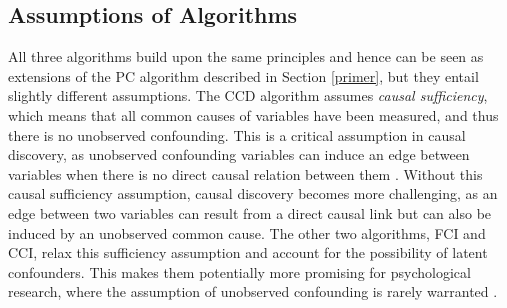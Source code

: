 \documentclass[twoside, 11pt]{article}
\begin{document}



\subsection{Assumptions of Algorithms}
All three algorithms build upon the same principles and hence can be seen as extensions of the PC algorithm described in Section \ref{primer}, but they entail slightly different assumptions. The CCD algorithm assumes \textit{causal sufficiency}, which means that all common causes of variables have been measured, and thus there is no unobserved confounding. This is a critical assumption in causal discovery, as unobserved confounding variables can induce an edge between variables when there is no direct causal relation between them \citep{lauritzen1996graphical, spirtes_causal_2013}.
Without this causal sufficiency assumption, causal discovery becomes more challenging, as an edge between two variables can result from a direct causal link but can also be induced by an unobserved common cause. 
The other two algorithms, FCI and CCI, relax this sufficiency assumption and account for the possibility of latent confounders. This makes them potentially more promising for psychological research, where the assumption of unobserved confounding is rarely warranted \citep{rohrer_thinking_2018}. 
\end{document}
